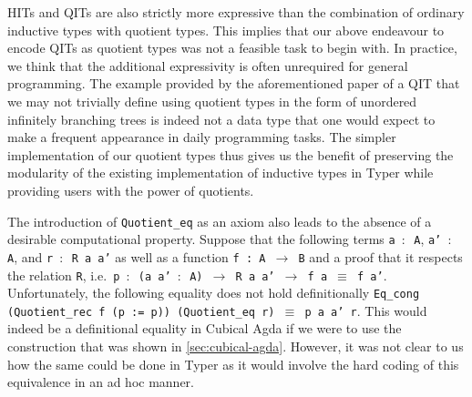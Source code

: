 \documentclass[12pt,twoside,maitrise]{dms}
\theoremstyle{definition}
\numberwithin{equation}{section}
\numberwithin{table}{chapter}
\numberwithin{figure}{chapter}
\newcommand\id[1] {\texttt{#1}}
\newcommand\fn[1] {\texttt{#1}}
\begin{document}
HITs and QITs are also strictly more expressive than the combination of ordinary
inductive types with quotient types\cite{fiore2022quotients}. This implies that
our above endeavour to encode QITs as quotient types was not a feasible task to
begin with. In practice, we think that the additional expressivity is often
unrequired for general programming. The example provided by the aforementioned
paper of a QIT that we may not trivially define using quotient types in the form
of unordered infinitely branching trees is indeed not a data type that one would
expect to make a frequent appearance in daily programming tasks. The simpler
implementation of our quotient types thus gives us the benefit of preserving the
modularity of the existing implementation of inductive types in Typer while
providing users with the power of quotients.

The introduction of \id{Quotient\_eq} as an axiom also leads to the absence of a
desirable computational property. Suppose that the following terms \fn{a $\colon$ A},
\fn{a' $\colon$ A}, and \fn{r $\colon$ R a a'} as well as a function \fn{f : A $\rightarrow$
  B} and a proof that it respects the relation \id{R}, i.e.\ \fn{p $\colon$ (a a' $\colon$ A)
  $\rightarrow$ R a a' $\rightarrow$ f a $\equiv$ f a'}. Unfortunately, the
following equality does not hold definitionally \fn{Eq\_cong (Quotient\_rec f (p
  := p)) (Quotient\_eq r) $\equiv$ p a a' r}. This would indeed be a
definitional equality in Cubical Agda if we were to use the construction that
was shown in \autoref{sec:cubical-agda}. However, it was not clear to us how the
same could be done in Typer as it would involve the hard coding of this
equivalence in an ad hoc manner.
\end{document}
